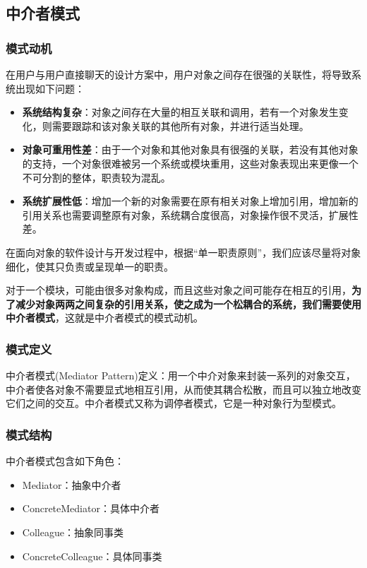 \subsection{中介者模式}

\subsubsection{模式动机}
在用户与用户直接聊天的设计方案中，用户对象之间存在很强的关联性，将导致系统出现如下问题：
\begin{itemize}
    \item \textbf{系统结构复杂}：对象之间存在大量的相互关联和调用，若有一个对象发生变化，则需要跟踪和该对象关联的其他所有对象，并进行适当处理。
    \item \textbf{对象可重用性差}：由于一个对象和其他对象具有很强的关联，若没有其他对象的支持，一个对象很难被另一个系统或模块重用，这些对象表现出来更像一个不可分割的整体，职责较为混乱。
    \item \textbf{系统扩展性低}：增加一个新的对象需要在原有相关对象上增加引用，增加新的引用关系也需要调整原有对象，系统耦合度很高，对象操作很不灵活，扩展性差。
\end{itemize}

在面向对象的软件设计与开发过程中，根据“单一职责原则”，我们应该尽量将对象细化，使其只负责或呈现单一的职责。

对于一个模块，可能由很多对象构成，而且这些对象之间可能存在相互的引用，\textbf{为了减少对象两两之间复杂的引用关系，使之成为一个松耦合的系统，我们需要使用中介者模式}，这就是中介者模式的模式动机。

\subsubsection{模式定义}
中介者模式(Mediator Pattern)定义：用一个中介对象来封装一系列的对象交互，中介者使各对象不需要显式地相互引用，从而使其耦合松散，而且可以独立地改变它们之间的交互。中介者模式又称为调停者模式，它是一种对象行为型模式。

\subsubsection{模式结构}
中介者模式包含如下角色：
\vspace{-0.8em}
\begin{multicols}{2}
    \begin{itemize}
        \item Mediator：抽象中介者
        \item ConcreteMediator：具体中介者
        \item Colleague：抽象同事类
        \item ConcreteColleague：具体同事类
    \end{itemize}
\end{multicols}
\vspace{-1em}

